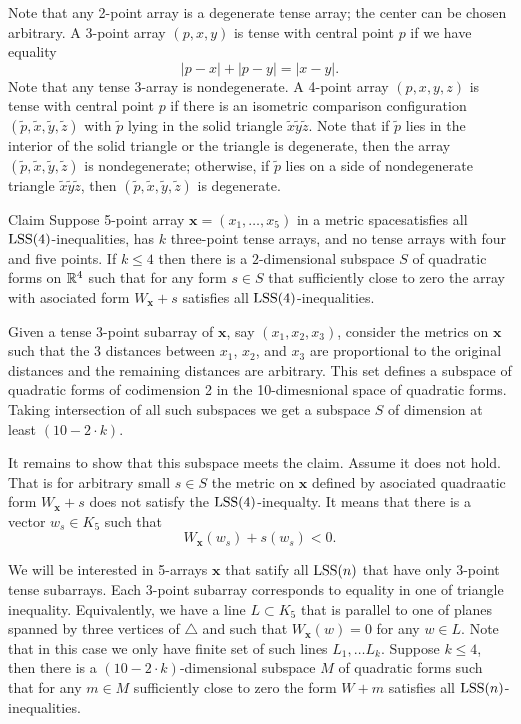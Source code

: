 \documentclass{article}
\begin{document}
Note that any 2-point array is a degenerate tense array; the center can be chosen arbitrary.
A 3-point array $(p,x,y)$ is tense with central point $p$ if we have equality 
\[|p-x|+|p-y|=|x-y|.\]
Note that any tense 3-array is nondegenerate.
A 4-point array $(p,x,y,z)$ is tense with central point $p$ if there is an isometric comparison configuration $(\tilde p,\tilde x,\tilde y,\tilde z)$ with $\tilde p$ lying in the solid triangle $\tilde x\tilde y\tilde z$.
Note that if $\tilde p$ lies in the interior of the solid triangle or the triangle is degenerate, then the array $(\tilde p,\tilde x,\tilde y,\tilde z)$ is nondegenerate;
otherwise, if $\tilde p$ lies on a side of nondegenerate triangle $\tilde x\tilde y\tilde z$, then $(\tilde p,\tilde x,\tilde y,\tilde z)$ is degenerate.

\begin{thm}{Claim}
Suppose 5-point array $\bm{x}=(x_1,\dots,x_5)$ in a metric spacesatisfies all $\mathrm{LSS}(4)$-inequalities, has $k$ three-point tense arrays, and no tense arrays with four and five points.
If $k\le 4$ then there is a $2$-dimensional subspace $S$ of quadratic forms on $\mathbb{R}^4$ such that for any form $s\in S$ that sufficiently close to zero the array with asociated form $W_{\bm{x}}+s$ satisfies all $\mathrm{LSS}(4)$-inequalities.
\end{thm}

Given a tense 3-point subarray of $\bm{x}$, say $(x_1,x_2,x_3)$, consider the metrics on $\bm{x}$ 
such that the 3 distances between $x_1$, $x_2$, and $x_3$ are proportional to the original distances and the remaining distances are arbitrary.
This set defines a subspace of quadratic forms of codimension 2 in the 10-dimesnional space of quadratic forms.
Taking intersection of all such subspaces we get a subspace $S$ of dimension at least $(10-2\cdot k)$.

It remains to show that this subspace meets the claim.
Assume it does not hold.
That is for arbitrary small $s\in S$ the metric on $\bm{x}$ defined by asociated quadraatic form $W_{\bm{x}}+s$ does not satisfy the $\mathrm{LSS}(4)$-inequalty.
It means that there is a vector $w_s\in K_5$ such that 
\[W_{\bm{x}}(w_s)+s(w_s)< 0.\]
\qeds



We will be interested in 5-arrays $\bm{x}$ that satify all $\mathrm{LSS}(n)$ that have only 3-point tense subarrays.
Each 3-point subarray corresponds to equality in one of triangle inequality.
Equivalently, we have a line $L\subset K_5$ that is parallel to one of planes spanned by three vertices of $\triangle$ and such that $W_{\bm{x}}(w)=0$ for any $w\in L$.
Note that in this case we only have finite set of such lines $L_1,\dots L_k$.
Suppose $k\le 4$, then there is a $(10-2\cdot k)$-dimensional subspace $M$ of quadratic forms such that for any $m\in M$ sufficiently close to zero the form 
$W+m$ satisfies all $\mathrm{LSS}(n)$-inequalities.
\end{document}
